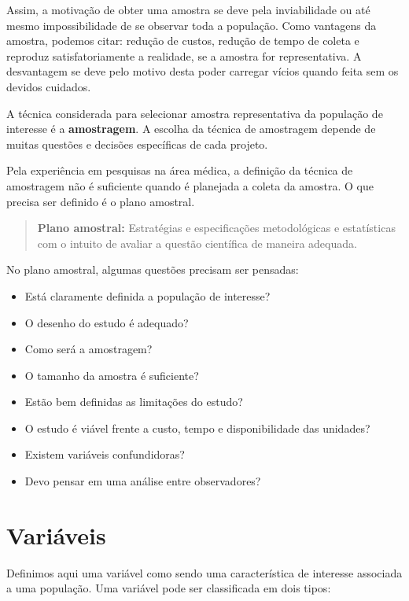 \documentclass[
]{book}
\begin{document}
Assim, a motivação de obter uma amostra se deve pela inviabilidade ou até mesmo impossibilidade de se observar toda a população. Como vantagens da amostra, podemos citar: redução de custos, redução de tempo de coleta e reproduz satisfatoriamente a realidade, se a amostra for representativa. A desvantagem se deve pelo motivo desta poder carregar vícios quando feita sem os devidos cuidados.

A técnica considerada para selecionar amostra representativa da população de interesse é a \textbf{amostragem}. A escolha da técnica de amostragem depende de muitas questões e decisões específicas de cada projeto.

Pela experiência em pesquisas na área médica, a definição da técnica de amostragem não é suficiente quando é planejada a coleta da amostra. O que precisa ser definido é o plano amostral.

\begin{quote}
\textbf{Plano amostral:}
Estratégias e especificações metodológicas e estatísticas com o intuito de avaliar a questão científica de maneira adequada.
\end{quote}

No plano amostral, algumas questões precisam ser pensadas:

\begin{itemize}
\item
  Está claramente definida a população de interesse?
\item
  O desenho do estudo é adequado?
\item
  Como será a amostragem?
\item
  O tamanho da amostra é suficiente?
\item
  Estão bem definidas as limitações do estudo?
\item
  O estudo é viável frente a custo, tempo e disponibilidade das unidades?
\item
  Existem variáveis confundidoras?
\item
  Devo pensar em uma análise entre observadores?
\end{itemize}

\hypertarget{variaveis}{%
\section{Variáveis}\label{variaveis}}

Definimos aqui uma variável como sendo uma característica de interesse associada a uma população. Uma variável pode ser classificada em dois tipos:
\end{document}
